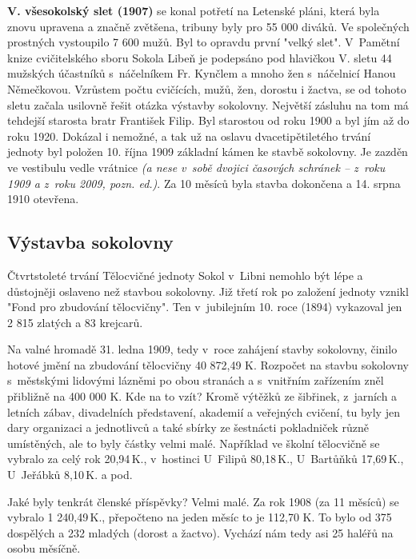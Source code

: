 \documentclass[a5paper, 11pt, twoside]{article}
\newcommand{\pozned}[1]{%
\textit{#1}}
\begin{document}
\textbf{V. všesokolský slet (1907)} se konal potřetí na Letenské pláni, která byla znovu upravena a značně zvětšena, tribuny byly pro 55 000 diváků. Ve společných prostných vystoupilo 7 600 mužů. Byl to opravdu první "velký slet". V~Pamětní knize cvičitelského sboru Sokola Libeň je podepsáno pod hlavičkou V. sletu 44 mužských účastníků s~náčelníkem Fr. Kynčlem a mnoho žen s~náčelnicí Hanou Němečkovou. Vzrůstem počtu cvičících, mužů, žen, dorostu i žactva, se od tohoto sletu začala usilovně řešit otázka výstavby sokolovny. Největší zásluhu na tom má tehdejší starosta bratr František Filip. Byl starostou od roku 1900 a byl jím až do roku 1920. Dokázal i nemožné, a tak už na oslavu dvacetipětiletého trvání jednoty byl položen 10. října 1909 základní kámen ke stavbě sokolovny. Je zazděn ve vestibulu vedle vrátnice \pozned{(a nese v~sobě dvojici časových schránek – z~roku 1909 a z~roku 2009, pozn. ed.)}. Za 10 měsíců byla stavba dokončena a 14. srpna 1910 otevřena.

\subsection{Výstavba sokolovny}

Čtvrtstoleté trvání Tělocvičné jednoty Sokol v~Libni nemohlo být lépe a
důstojněji oslaveno než stavbou sokolovny. Již třetí rok po založení
jednoty vznikl "Fond pro zbudování tělocvičny". Ten v~jubilejním 10.
roce (1894) vykazoval jen 2 815 zlatých a 83 krejcarů.

Na valné hromadě 31. ledna 1909, tedy v~roce zahájení stavby sokolovny,
činilo hotové jmění na zbudování tělocvičny 40 872,49 K. Rozpočet na
stavbu sokolovny s~městskými lidovými lázněmi po obou stranách a
s~vnitřním zařízením zněl přibližně na 400 000 K. Kde na to vzít? Kromě
výtěžků ze šibřinek, z~jarních a letních zábav, divadelních představení,
akademií a veřejných cvičení, tu byly jen dary organizaci a jednotlivců
a také sbírky ze šestnácti pokladniček různě umístěných, ale to byly
částky velmi malé. Například ve školní tělocvičně se vybralo za celý rok
20,94\,K., v~hostinci U~Filipů 80,18\,K., U~Bartůňků 17,69\,K., U~Jeřábků
8,10\,K. a pod.

Jaké byly tenkrát členské příspěvky? Velmi malé. Za rok 1908 (za 11
měsíců) se vybralo 1 240,49\,K., přepočteno na jeden měsíc to je 112,70
K. To bylo od 375 dospělých a 232 mladých (dorost a žactvo). Vychází nám
tedy asi 25 haléřů na osobu měsíčně.
\end{document}
